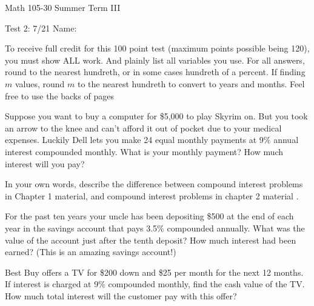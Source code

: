 \documentclass[11pt,epsfig]{article}
\begin{document}
Math 105-30 Summer Term III 

Test 2: 7/21 \hspace{1.9in} {Name:} {\underline {\hspace{3.5in}}}
\vspace{2pc}

To receive full credit for this 100 point test (maximum points possible being 120), you must show ALL work. And plainly list all variables you use. For all answers, round to the nearest hundreth, or in some cases hundreth of a percent. If finding $m$ values, round $m$ to the nearest hundreth to convert to years and months. Feel free to use the backs of pages
\vspace{2pc}



\begin{problem}{12}
Suppose you want to buy a computer for \$5,000 to play Skyrim on. But you took an arrow to the knee and can't afford it out of pocket due to your medical expenses. Luckily Dell lets you make 24 equal monthly payments at 9\% annual interest compounded monthly. What is your monthly payment? How much interest will you pay?

\vfill
\end{problem}

\begin{problem}{12}
In your own words, describe the difference between compound interest problems in Chapter 1 material, and compound interest problems in chapter 2 material .

\vfill
\end{problem}

\newpage

\begin{problem}{12}
For the past ten years your uncle has been depositing \$500 at the end of each year in the savings account that pays 3.5\% compounded annually. What was the value of the account just after the tenth deposit? How much interest had been earned? (This is an amazing savings account!)

\vfill
\end{problem}

\begin{problem}{12}
Best Buy offers a TV for \$200 down and \$25 per month for the next 12 months. If interest is charged at 9\% compounded monthly, find the cash value of the TV. How much total interest will the customer pay with this offer?

\vfill
\end{problem}
\end{document}
